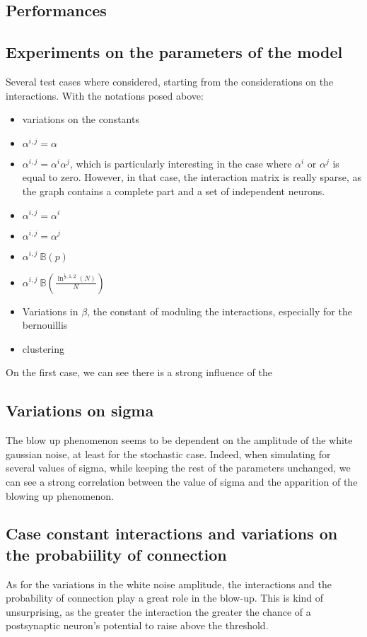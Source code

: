 \subsection{Performances}

\subsection{Experiments on the parameters of the model}
Several test cases where considered, starting from the considerations on the interactions. With the notations posed above:\\
	\begin{itemize}
		\item variations on the constants
		\item $ \alpha^{i,j}=\alpha $
		\item $ \alpha^{i,j}=\alpha^i\alpha^j $, which is particularly interesting in the case where $ \alpha^i\text{ or }\alpha^j $ is equal to zero. However, in that case, the interaction matrix is really sparse, as the graph contains a complete part and a set of independent neurons.
		\item $ \alpha^{i,j}=\alpha^i $
		\item $ \alpha^{i,j}=\alpha^j $
		\item $ \alpha^{i,j}~\mathbb{B}(p) $
		\item $ \alpha^{i,j}~\mathbb{B}(\frac{\ln^{\frac{1}{2},1,2}(N)}{N}) $
		\item Variations in $ \beta $, the constant of moduling the interactions, especially for the bernouillis
		\item clustering
	\end{itemize}
	On the first case, we can see there is a strong influence of the 

	\subsection{Variations on sigma}
	The blow up phenomenon seems to be dependent on the amplitude of the white gaussian noise, at least for the stochastic case. Indeed, when simulating for several values of sigma, while keeping the rest of the parameters unchanged, we can see a strong correlation between the value of sigma and the apparition of the blowing up phenomenon.

	\subsection{Case constant interactions and variations on the probabiility of connection}
	As for the variations in the white noise amplitude, the interactions and the probability of connection play a great role in the blow-up. This is kind of unsurprising, as the greater the interaction the greater the chance of a postsynaptic neuron's potential to raise above the threshold.

